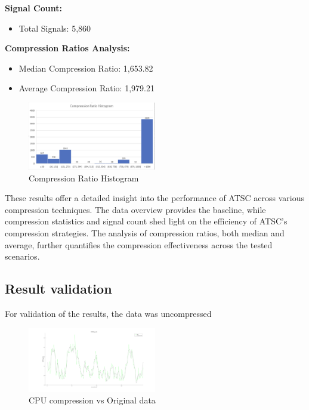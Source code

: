 \documentclass[conference]{IEEEtran}
\begin{document}
\textbf{Signal Count:}

\begin{itemize}
    \item Total Signals: 5,860
\end{itemize}

\textbf{Compression Ratios Analysis:}

\begin{itemize}
    \item Median Compression Ratio: 1,653.82
    \item Average Compression Ratio: 1,979.21
\end{itemize}

\begin{figure}[h]
  \centering
  \includegraphics[width=0.5\textwidth]{Fig5.png}
  \caption{Compression Ratio Histogram}
  \label{Fig.6}
\end{figure}

\vspace{10pt}
These results offer a detailed insight into the performance of ATSC across various compression techniques. The data overview provides the baseline, while compression statistics and signal count shed light on the efficiency of ATSC's compression strategies. The analysis of compression ratios, both median and average, further quantifies the compression effectiveness across the tested scenarios. 
 
\subsection{Result validation}

For validation of the results, the data was uncompressed


\begin{figure}[h]
  \centering
  \includegraphics[width=0.5\textwidth]{cpu-usage-validation.png}
  \caption{CPU compression vs Original data}
  \label{cpu}
\end{figure}
\end{document}
